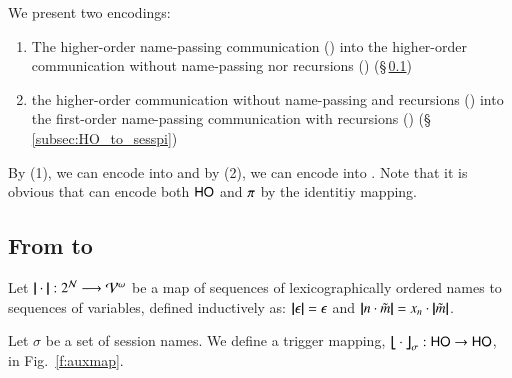 We present two encodings:
\begin{enumerate}
\item The higher-order name-passing communication (\HOp) into 
the higher-order communication without name-passing nor 
recursions (\HO) (\S\,\ref{subsec:HOpi_to_HO})
\item the higher-order communication without 
name-passing and recursions (\HO)
into the first-order name-passing communication
with recursions (\sessp) (\S\,\ref{subsec:HO_to_sesspi})
\end{enumerate}
By (1), we can encode \sessp into \HO and by (2), 
we can encode \HOp into \sessp.  
Note that it is obvious that \HOp can encode both 
$\mathsf{HO}$ and $\pi$ by the identitiy mapping. 

\subsection{From \HOp to \HO}
\label{subsec:HOpi_to_HO}

\begin{definition}\rm 
	Let $|\!|\cdot|\!|: 2^{\mathcal{N}} \longrightarrow \mathcal{V}^\omega$
	be a map of sequences of 
lexicographically ordered names to sequences of variables, defined
	inductively as: 
	$|\!|\epsilon|\!| = \epsilon$ and $|\!|n \cdot \tilde{m}|\!| = x_n \cdot |\!|\tilde{m}|\!|$. 
\end{definition}

\begin{definition} \label{d:trabs}\label{d:auxmap}
	Let $\sigma$ be a set of session names.
	We define a trigger mapping,  
$\big\lfloor\!\!\big\lfloor\cdot\big\rfloor\!\!\big\rfloor^{}_\sigma: \mathsf{HO} \to \mathsf{HO}$, in Fig.~\ref{f:auxmap}.
\end{definition}


